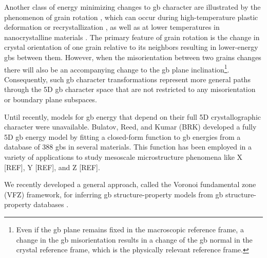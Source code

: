 \documentclass[final,twocolumn,12pt]{elsarticle}
\begin{document}
	Another class of energy minimizing changes to \gls{gb} character are illustrated by the phenomenon of grain rotation \cite{basakTwodimensionalStudyCoupled2014,bernsteinInfluenceGeometryGrain2008,fujitaDirectObservationSubgrainGrowth1961,huangGrainRotationLattice2015,sharmaObservationChangingCrystal2012,trauttCapillarydrivenGrainBoundary2014,ueharaAtomisticStudyGrain2008,upmanyuSimultaneousGrainBoundary2006,upmanyuSimultaneousGrainBoundary2006b,weissmannMechanismRecrystallizationAluminum1958}, which can occur during high-temperature plastic deformation \cite{ashbyApplicationBoundTheorems1978,gifkinsGrainboundarySlidingIts1976,herringDiffusionalViscosityPolycrystalline1950,leeStrainRateDependent1970,matsukiRelativeMotionGrains1977,nabarroSteadystateDiffusionalCreep1967,zelinGeometricalAspectsSuperplastic1996} or recrystallization \cite{liPossibilitySubgrainRotation1962}, as well as at lower temperatures in nanocrystalline materials \cite{wangGrainRotationMediated2014}. The primary feature of grain rotation is the change in crystal orientation of one grain relative to its neighbors resulting in lower-energy \glspl{gb} between them. However, when the misorientation between two grains changes there will also be an accompanying change to the \gls{gb} plane inclination\footnote{Even if the \gls{gb} plane remains fixed in the macroscopic reference frame, a change in the \gls{gb} misorientation results in a change of the \gls{gb} normal in the crystal reference frame, which is the physically relevant reference frame.}. Consequently, such \gls{gb} character transformations represent more general paths through the 5D \gls{gb} character space that are not restricted to any misorientation or boundary plane subspaces.
	
	Until recently, models for \gls{gb} energy that depend on their full 5D crystallographic character were unavailable. Bulatov, Reed, and Kumar (BRK) \cite{bulatovGrainBoundaryEnergy2014} developed a fully 5D \gls{gb} energy model by fitting a closed-form function to \gls{gb} energies from a database \cite{olmstedSurveyComputedGrain2009a} of 388 \glspl{gb} in several materials. This function has been employed in a variety of applications to study mesoscale microstructure phenomena like X [REF], Y [REF], and Z [REF].
	
	We recently developed a general approach, called the Voronoi fundamental zone (VFZ) framework, for inferring \gls{gb} structure-property models from \gls{gb} structure-property databases \cite{bairdFiveDegreeoffreedomProperty2021}. 
	
\end{document}
